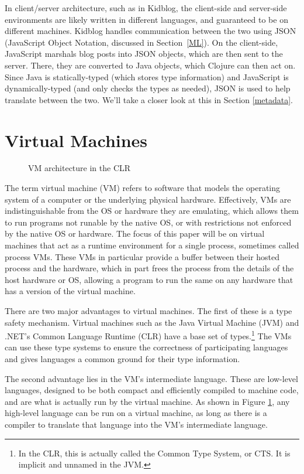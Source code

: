 \documentclass{sig-alternate}
\begin{document}
In client/server architecture, such as in Kidblog, the client-side and server-side environments are likely written in different languages, and guaranteed to be on different machines. Kidblog handles communication between the two using JSON (JavaScript Object Notation, discussed in Section~\ref{ML}). On the client-side, JavaScript marshals blog posts into JSON objects, which are then sent to the server. There, they are converted to Java objects, which Clojure can then act on. Since Java is statically-typed (which stores type information) and JavaScript is dynamically-typed (and only checks the types as needed), JSON is used to help translate between the two. We'll take a closer look at this in Section \ref{metadata}.



\section{Virtual Machines}\label{VM}
\begin{figure}
\caption{VM architecture in the CLR~\cite{wiki:CLR}}
\label{VMmodel}
\end{figure}

The term virtual machine (VM) refers to software that models the operating system of a computer or the underlying physical hardware. Effectively, VMs are indistinguishable from the OS or hardware they are emulating, which allows them to run programs not runable by the native OS, or with restrictions not enforced by the native OS or hardware.
The focus of this paper will be on virtual machines that act as a runtime environment for a single process, sometimes called process VMs. These VMs in particular provide a buffer between their hosted process and the hardware, which in part frees the process from the details of the host hardware or OS, allowing a program to run the same on any hardware that has a version of the virtual machine.~\cite{wiki:VM}

There are two major advantages to virtual machines. The first of these is a type safety mechanism. Virtual machines such as the Java Virtual Machine (JVM) and .NET's Common Language Runtime (CLR) have a base set of types.\footnote{In the CLR, this is actually called the Common Type System, or CTS. It is implicit and unnamed in the JVM.} The VMs can use these type systems to ensure the correctness of participating languages and gives languages a common ground for their type information.

The second advantage lies in the VM's intermediate language. These are low-level languages, designed to be both compact and efficiently compiled to machine code, and are what is actually run by the virtual machine. As shown in Figure \ref{VMmodel}, any high-level language can be run on a virtual machine, as long as there is a compiler to translate that language into the VM's intermediate language.
\end{document}
